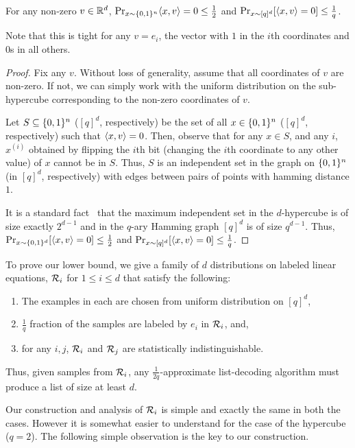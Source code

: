 \begin{lemma}
For any non-zero $v \in \mathbb R^d$, $\Pr_{x \sim \{0,1\}^n} \langle x,v\rangle = 0 \leq \frac{1}{2}$ and $\Pr_{x \sim [q]^d} [\langle x,v\rangle = 0] \leq \frac{1}{q}$.
\end{lemma}
Note that this is tight for any $v = e_i$, the vector with $1$ in the $i$th coordinates and $0$s in all others.
\begin{proof}
Fix any $v$. 
Without loss of generality, assume that all coordinates of $v$ are non-zero. 
If not, we can simply work with the uniform distribution on the sub-hypercube corresponding to the non-zero coordinates of $v$. 



Let $S \subseteq \{0,1\}^n$ ($[q]^d$, respectively) be the set of all $x \in \{0,1\}^n$ ($[q]^d$, respectively) such that $\langle x,v\rangle = 0$. 
Then, observe that for any $x \in S$, and any $i$, $x^{(i)}$ obtained by flipping the $i$th bit (changing the $i$th coordinate to any other value) of $x$ cannot be in $S$. 
Thus, $S$ is an independent set in the graph on $\{0,1\}^n$ (in $[q]^d$, respectively) with edges between pairs of points with hamming distance $1$. 

It is a standard fact~\cite{wiki-singleton} that the maximum independent set in the $d$-hypercube is of size exactly $2^{d-1}$ and in the $q$-ary Hamming graph $[q]^d$ is of size $q^{d-1}$. 
Thus, $\Pr_{x \sim \{0,1\}^d} [\langle x,v\rangle = 0] \leq \frac{1}{2}$ and $\Pr_{x \sim [q]^d} [\langle x,v\rangle = 0] \leq \frac{1}{q}$.



\end{proof}

To prove our lower bound, we give a family of $d$ distributions on labeled linear equations, $\mathcal R_i$  for  $1 \leq i \leq d$ that satisfy the following: 
\begin{enumerate}
\item The examples in each are chosen from uniform distribution on $[q]^d$, 
\item $\frac{1}{q}$ fraction of the samples are labeled by $e_i$ in $\mathcal R_i$, and, 
\item for any $i, j$, $\mathcal R_i$ and $\mathcal R_j$ are statistically indistinguishable. 
\end{enumerate}
Thus, given samples from $\mathcal R_i$, any $\frac{1}{2q}$-approximate list-decoding algorithm must produce a list of size at least $d$.

Our construction and analysis of $\mathcal R_i$ is simple and exactly the same in both the cases. 
However it is somewhat easier to understand for the  case of the hypercube ($q = 2$).
The following simple observation is the key to our construction.

